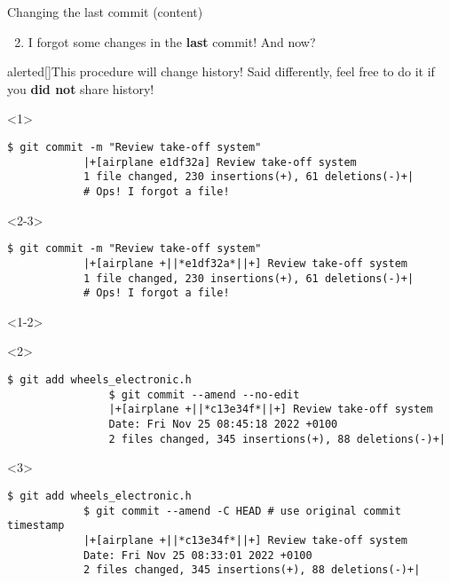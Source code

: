 \documentclass[usenames,svgnames,14pt]{beamer}
\begin{document}
\begin{frame}[fragile]{Changing the last commit (content)}
    \begin{enumerate}
        \setcounter{enumi}{1}
        \item I forgot some changes in the \textbf{last} commit! And now?
    \end{enumerate}
    \begin{varblock}{alerted}[\textwidth]{This procedure will change history!}
        Said differently, feel free to do it if you \alert{\textbf{did not}} share history!
    \end{varblock}
    \vspace{3mm}
    \begin{onlyenv}<1>
        \begin{lstlisting}[style=MyBash]
            $ git commit -m "Review take-off system"
            |+[airplane e1df32a] Review take-off system
            1 file changed, 230 insertions(+), 61 deletions(-)+|
            # Ops! I forgot a file!
        \end{lstlisting}
    \end{onlyenv}
    \begin{onlyenv}<2-3>
        \begin{lstlisting}[style=MyBash]
            $ git commit -m "Review take-off system"
            |+[airplane +||*e1df32a*||+] Review take-off system
            1 file changed, 230 insertions(+), 61 deletions(-)+|
            # Ops! I forgot a file!
        \end{lstlisting}
    \end{onlyenv}
    \begin{onlyenv}<1-2>
        \begin{uncoverenv}<2>
            \begin{lstlisting}[style=MyBash]
                $ git add wheels_electronic.h
                $ git commit --amend --no-edit
                |+[airplane +||*c13e34f*||+] Review take-off system
                Date: Fri Nov 25 08:45:18 2022 +0100
                2 files changed, 345 insertions(+), 88 deletions(-)+|
            \end{lstlisting}
        \end{uncoverenv}
    \end{onlyenv}
    \begin{onlyenv}<3>
    \begin{lstlisting}[style=MyBash]
            $ git add wheels_electronic.h
            $ git commit --amend -C HEAD # use original commit timestamp
            |+[airplane +||*c13e34f*||+] Review take-off system
            Date: Fri Nov 25 08:33:01 2022 +0100
            2 files changed, 345 insertions(+), 88 deletions(-)+|
        \end{lstlisting}
    \end{onlyenv}
\end{frame}
\end{document}

